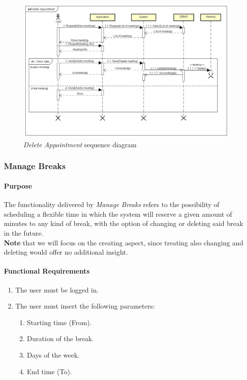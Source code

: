 \begin{figure}
	\includegraphics[width=\textheight, height=\textwidth, keepaspectratio=true]{Img/DeleteAppointmentSQ}
	\caption{\emph{Delete Appointment} sequence diagram}
	\label{fig:DeleteAppointmentSQ}
\end{figure}

\clearpage
\subsubsection{Manage Breaks}
\paragraph*{Purpose\\}
The functionality delivered by \emph{Manage Breaks} refers to the possibility of scheduling a flexible time in which the system will reserve a given amount of minutes to any kind of break, with the option of changing or deleting said break in the future.\\
\textbf{Note} that we will focus on the creating aspect, since treating also changing and deleting would offer no additional insight.
\paragraph*{Functional Requirements}
\begin{enumerate}[label=R.\arabic*:,resume]
	\item The user must be logged in.
	\item The user must insert the following parameters:
	\begin{enumerate}
	\item Starting time (From).
	\item Duration of the break.
	\item Days of the week.
	\item End time (To).
	\end{enumerate}
\end{enumerate}
